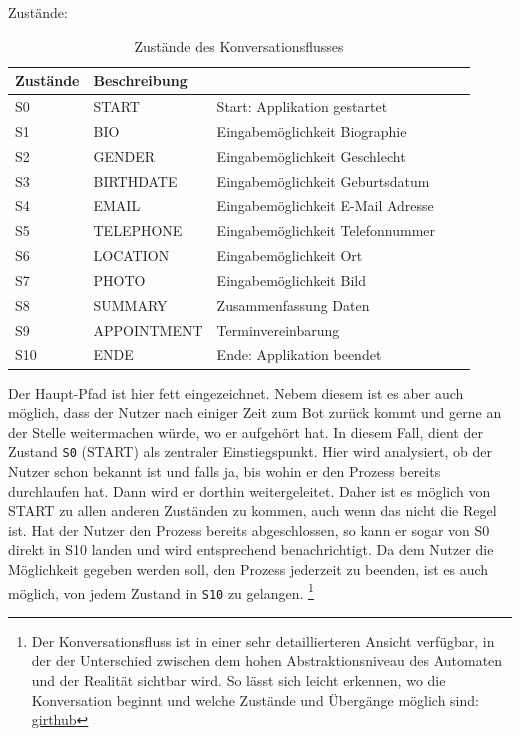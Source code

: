 	Zustände:
	\begin{table} %
		\centering
		\begin{tabular}{l | l l l l}
			\textbf{Zustände} 	& \textbf{Beschreibung}\\
			\hline
			S0 					&		 START 			&		 Start: Applikation gestartet\\
			S1 					&		 BIO 			&		 Eingabemöglichkeit Biographie\\
			S2 					&		 GENDER 		&		 Eingabemöglichkeit Geschlecht\\
			S3 					&		 BIRTHDATE 		&		 Eingabemöglichkeit Geburtsdatum\\
			S4 					&		 EMAIL 			&		 Eingabemöglichkeit E-Mail Adresse\\
			S5 					&		 TELEPHONE 		&		 Eingabemöglichkeit Telefonnummer\\
			S6 					&		 LOCATION 		&		 Eingabemöglichkeit Ort\\
			S7 					&		 PHOTO 			&		 Eingabemöglichkeit Bild\\
			S8 					&		 SUMMARY 		&		 Zusammenfassung Daten\\
			S9 					&		 APPOINTMENT	&		 Terminvereinbarung \\
			S10 				&		 ENDE 			&		 Ende: Applikation beendet\\

		\end{tabular}
		\caption{Zustände des Konversationsflusses}
		\label{tab: states}
	\end{table}

	Der Haupt-Pfad ist hier fett eingezeichnet. Nebem diesem ist es aber auch möglich, dass der Nutzer nach einiger Zeit zum Bot zurück kommt und gerne an der Stelle weitermachen würde, wo er aufgehört hat. In diesem Fall, dient der Zustand \verb|S0| (START) als zentraler Einstiegspunkt. Hier wird analysiert, ob der Nutzer schon bekannt ist und falls ja, bis wohin er den Prozess bereits durchlaufen hat. Dann wird er dorthin weitergeleitet. Daher ist es möglich von START zu allen anderen Zuständen zu kommen, auch wenn das nicht die Regel ist. Hat der Nutzer den Prozess bereits abgeschlossen, so kann er sogar von S0 direkt in S10 landen und wird entsprechend benachrichtigt. Da dem Nutzer die Möglichkeit gegeben werden soll, den Prozess jederzeit zu beenden, ist es auch möglich, von jedem Zustand in \verb|S10| zu gelangen. \footnote{Der Konversationsfluss ist in einer sehr detaillierteren Ansicht verfügbar, in der der Unterschied zwischen dem hohen Abstraktionsniveau des Automaten und der Realität sichtbar wird. So lässt sich leicht erkennen, wo die Konversation beginnt und welche Zustände und Übergänge möglich sind: \url{girthub}} 